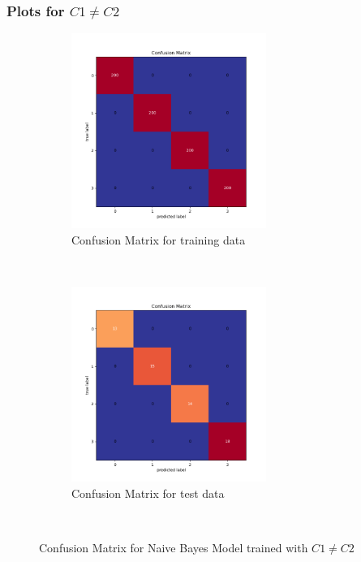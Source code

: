 \newpage
\subsubsection{Plots for $C1 \neq C2$ }

\begin{figure}[!ht]
    \centering
    \begin{subfigure}[t]{0.5\textwidth}
        \centering
        \includegraphics[height=2.5in]{Dataset_1a/Naive_Bayes_Classifier_case1_cmatrix_train_data.png}
        \caption{Confusion Matrix for training data}
    \end{subfigure}%
    ~ 
    \begin{subfigure}[t]{0.5\textwidth}
        \centering
        \includegraphics[height=2.5in]{Dataset_1a/Naive_Bayes_Classifier_case1_cmatrix_test_data.png}
        \caption{Confusion Matrix for test data}
    \end{subfigure}%
    ~
    \caption{Confusion Matrix for Naive Bayes Model trained with $C1 \neq C2$}
    \label{fig:11}
\end{figure}

